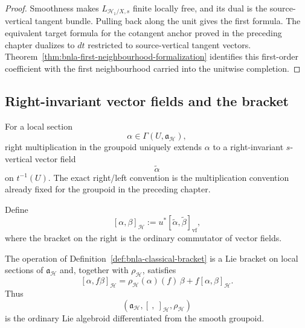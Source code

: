 \begin{proof}
Smoothness makes $L_{\mathcal H_1/X,s}$ finite locally free, and its dual is
the source-vertical tangent bundle.  Pulling back along the unit gives the
first formula.  The equivalent target formula for the cotangent anchor proved
in the preceding chapter dualizes to $dt$ restricted to source-vertical
tangent vectors.  Theorem~\ref{thm:bnla-first-neighbourhood-formalization}
identifies this first-order coefficient with the first neighbourhood carried
into the unitwise completion.
\end{proof}

\subsection{Right-invariant vector fields and the bracket}

For a local section
\[
    \alpha\in\Gamma(U,\mathfrak a_{\mathcal H}),
\]
right multiplication in the groupoid uniquely extends $\alpha$ to a
right-invariant $s$-vertical vector field
\[
    \widetilde\alpha
\]
on $t^{-1}(U)$.  The exact right/left convention is the multiplication
convention already fixed for the groupoid in the preceding chapter.

\begin{definition}
\label{def:bnla-classical-bracket}
Define
\[
    [\alpha,\beta]_{\mathcal H}
    :=
    u^*
    [\widetilde\alpha,\widetilde\beta]_{\mathrm{vf}},
\]
where the bracket on the right is the ordinary commutator of vector fields.
\end{definition}

\begin{theorem}
\label{thm:bnla-classical-bracket}
The operation of
Definition~\ref{def:bnla-classical-bracket} is a Lie bracket on local sections
of $\mathfrak a_{\mathcal H}$ and, together with
$\rho_{\mathcal H}$, satisfies
\[
    \boxed{
    [\alpha,f\beta]_{\mathcal H}
    =
    \rho_{\mathcal H}(\alpha)(f)\,\beta
    +
    f[\alpha,\beta]_{\mathcal H}.}
\]
Thus
\[
    \left(
        \mathfrak a_{\mathcal H},
        [\ ,\ ]_{\mathcal H},
        \rho_{\mathcal H}
    \right)
\]
is the ordinary Lie algebroid differentiated from the smooth groupoid.
\end{theorem}

